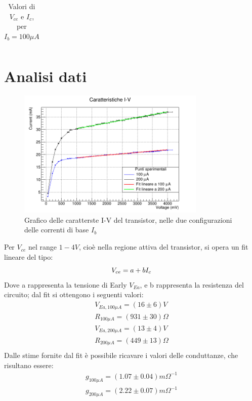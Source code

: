 \documentclass{article}
\begin{document}
\begin{longtable}[c]{|l|l|l|l|l|l|l|l|l|}
    \caption{\label{tab:Tabella2}{Valori di $V_{ce}$ e $I_c$, per $I_b=100\mu A$}}                                                                                                                            \\
\end{longtable}


\section{Analisi dati}
\begin{figure}[H]
    \centering
    \includegraphics[width=0.8\textwidth]{Multigraph.png}
    \caption{\label{fig:multigraph}Grafico delle caratterste I-V del transistor, nelle due configurazioni delle correnti di base $I_b$}
\end{figure}
Per $V_{ce}$ nel range $1-4 V$, cioè nella regione attiva del transistor, si opera un fit lineare del tipo:
\begin{equation}
    V_{ce} = a + b I_c\\
\end{equation}
Dove a rappresenta la tensione di Early $V_{Ea}$, e b rappresenta la resistenza del circuito; dal fit si ottengono i seguenti valori:
\begin{equation}
    \begin{aligned}
        V_{Ea,100\mu A}=(16\pm 6) V \\
        R_{100\mu A}=(931 \pm 30) \Omega \\
        V_{Ea,200\mu A}=(13\pm 4) V \\
        R_{200\mu A}=(449 \pm 13) \Omega\\
    \end{aligned}
\end{equation} 
Dalle stime fornite dal fit è possibile ricavare i valori delle conduttanze, che risultano essere:
\begin{equation}
    \begin{aligned}
        g_{100 \mu A}=(1.07 \pm 0.04) m\Omega^{-1} \\
        g_{200 \mu A}=(2.22 \pm 0.07) m\Omega^{-1}\\
    \end{aligned}
\end{equation}
\end{document}
